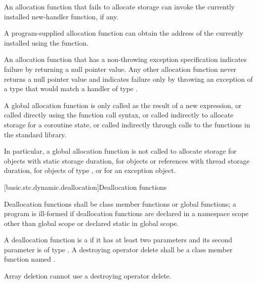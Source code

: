 \pnum
An allocation function that fails to allocate storage can invoke the
currently installed new-handler function, if any.
\begin{note}
%
A program-supplied allocation function can obtain the address of the
currently installed  using the
 function.
\end{note}
An allocation function that has a non-throwing
exception specification
indicates failure by returning
a null pointer value.
Any other allocation function
never returns a null pointer value and
indicates failure only by throwing an exception of a type
that would match a handler of type
.

\pnum
A global allocation function is only called as the result of a new
expression, or called directly using the function call
syntax, or called indirectly to allocate storage for
a coroutine state,
or called indirectly through calls to the
functions in the \Cpp{} standard library.
\begin{note}
In particular, a
global allocation function is not called to allocate storage for objects
with static storage duration, for objects or references
with thread storage duration, for objects of
type , or for an
exception object.
\end{note}

[basic.stc.dynamic.deallocation]{Deallocation functions}

\pnum
{}%
Deallocation functions shall be class member functions or global
functions; a program is ill-formed if deallocation functions are
declared in a namespace scope other than global scope or declared static
in global scope.

\pnum
A deallocation function
is a 
if it has at least two parameters
and its second parameter
is of type .
A destroying operator delete
shall be a class member function named .
\begin{note}
Array deletion cannot use a destroying operator delete.
\end{note}

